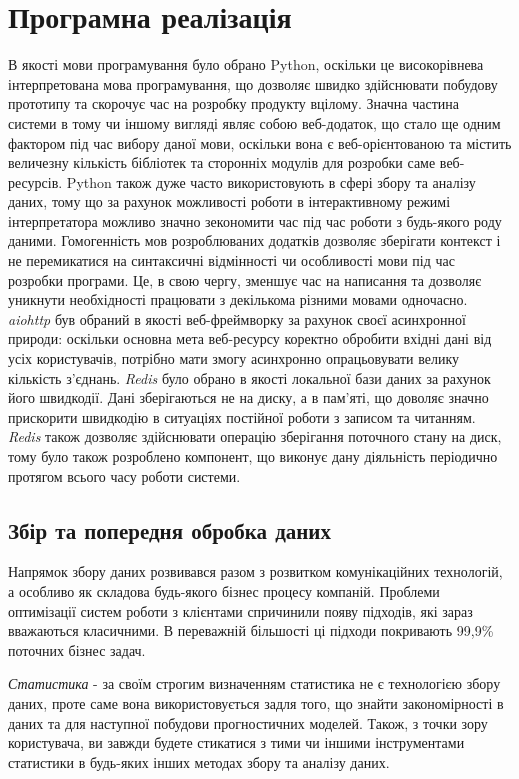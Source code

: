 \section{Програмна реалізація}
В якості мови програмування було обрано Python, оскільки це високорівнева інтерпретована мова програмування, що дозволяє швидко здійснювати побудову прототипу та скорочує час на розробку продукту вцілому. Значна частина системи в тому чи іншому вигляді являє собою веб-додаток, що стало ще одним фактором під час вибору даної мови, оскільки вона є веб-орієнтованою та містить величезну кількість бібліотек та сторонніх модулів для розробки саме веб-ресурсів. Python також дуже часто використовують в сфері збору та аналізу даних, тому що за рахунок можливості роботи в інтерактивному режимі інтерпретатора можливо значно зекономити час під час роботи з будь-якого роду даними. Гомогенність мов розроблюваних додатків дозволяє зберігати контекст і не перемикатися на синтаксичні відмінності чи особливості мови під час розробки програми. Це, в свою чергу, зменшує час на написання та дозволяє уникнути необхідності працювати з декількома різними мовами одночасно.
\textit{aiohttp} був обраний в якості веб-фреймворку за рахунок своєї асинхронної природи: оскільки основна мета веб-ресурсу коректно обробити вхідні дані від усіх користувачів, потрібно мати змогу асинхронно опрацьовувати велику кількість з'єднань. \textit{Redis} було обрано в якості локальної бази даних за рахунок його швидкодії. Дані зберігаються не на диску, а в пам'яті, що доволяє значно прискорити швидкодію в ситуаціях постійної роботи з записом та читанням. \textit{Redis} також дозволяє здійснювати операцію зберігання поточного стану на диск, тому було також розроблено компонент, що виконує дану діяльність періодично протягом всього часу роботи системи.

\subsection{Збір та попередня обробка даних}
Напрямок збору даних розвивався разом з розвитком комунікаційних технологій, а особливо як складова будь-якого бізнес процесу компаній. Проблеми оптимізації систем роботи з клієнтами спричинили появу підходів, які зараз вважаються класичними. В переважній більшості ці підходи покривають 99,9\% поточних бізнес задач.

\textit{Статистика} - за своїм строгим визначенням статистика не є технологією збору даних, проте саме вона використовується задля того, що знайти закономірності в даних та для наступної побудови прогностичних моделей. Також, з точки зору користувача, ви завжди будете стикатися з тими чи іншими інструментами статистики в будь-яких інших методах збору та аналізу даних.

